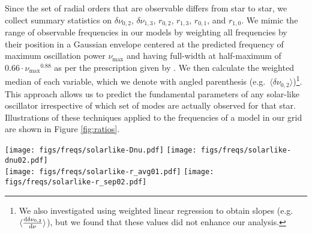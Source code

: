 \documentclass[manuscript]{aastex}
\begin{document}
Since the set of radial orders that are observable differs from star to star, we collect summary statistics on $\delta\nu_{0,2}$, $\delta\nu_{1,3}$, $r_{0,2}$, $r_{1,3}$, $r_{0,1}$, and $r_{1,0}$. %
We mimic the range of observable frequencies in our models by weighting all frequencies by their position in a Gaussian envelope centered at the predicted frequency of maximum oscillation power $\nu_{\max}$ and having full-width at half-maximum of $0.66\cdot\nu_{\max}{}^{0.88}$ as per the prescription given by \citet{2012A&A...537A..30M}. We then calculate the weighted median of each variable, which we denote with angled parenthesis (e.g.~$\langle\delta\nu_{0,2}\rangle$)\footnote{We also investigated using weighted linear regression to obtain slopes (e.g.~$\langle\dv{\delta\nu_{0,2}}{\nu}\rangle$), but we found that these values did not enhance our analysis.}. This approach allows us to predict the fundamental parameters of any solar-like oscillator irrespective of which set of modes are actually observed for that star. Illustrations of these techniques applied to the frequencies of a model in our grid are shown in Figure \ref{fig:ratios}. 

\begin{figure*}
    \centering
    \texttt{[image: figs/freqs/solarlike-Dnu.pdf]}\hfill
    \texttt{[image: figs/freqs/solarlike-dnu02.pdf]}\\
    \texttt{[image: figs/freqs/solarlike-r\_avg01.pdf]}\hfill
    \texttt{[image: figs/freqs/solarlike-r\_sep02.pdf]}%
    \caption{The large and small frequency separations ($\Delta\nu$ and $\delta\nu_{0,2}$, top) and frequency ratios ($r_{0,1}$ and $r_{0,2}$, bottom) of a model in our grid. The vertical dotted line indicates $\nu_{\max}$. A $\nu_{\max}$-weighted linear fit is indicated with a dashed diagonal line to guide the eye. Point sizes and colors are proportional to the applied weighting, with blue points having a large influence and red points having little. \textbf{todo: find example with less whitespace?}}%
    \label{fig:ratios}
\end{figure*}
\end{document}
